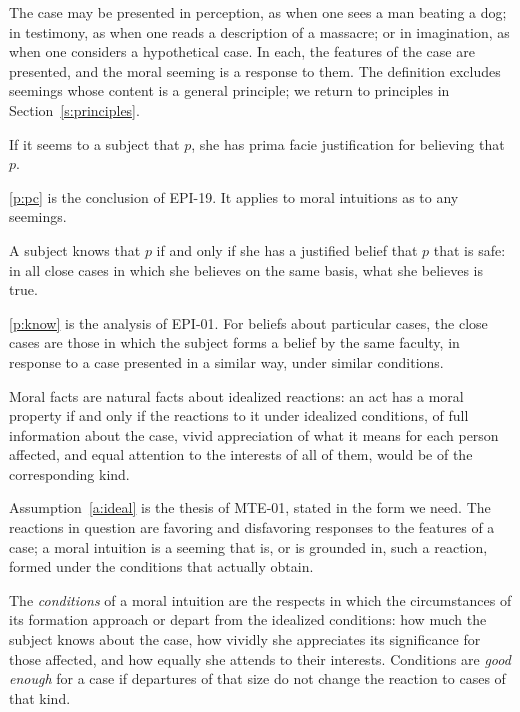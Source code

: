 \documentclass{situationist-preprint}
\begin{document}
The case may be presented in perception, as when one sees a man beating a dog; in testimony, as when one reads a description of a massacre; or in imagination, as when one considers a hypothetical case. In each, the features of the case are presented, and the moral seeming is a response to them. The definition excludes seemings whose content is a general principle; we return to principles in Section~\ref{s:principles}.

\begin{principle}\label{p:pc}
If it seems to a subject that $p$, she has prima facie justification for believing that $p$.
\end{principle}

\ref{p:pc} is the conclusion of EPI-19. It applies to moral intuitions as to any seemings.

\begin{principle}[Knowledge]\label{p:know}
A subject knows that $p$ if and only if she has a justified belief that $p$ that is safe: in all close cases in which she believes on the same basis, what she believes is true.
\end{principle}

\ref{p:know} is the analysis of EPI-01. For beliefs about particular cases, the close cases are those in which the subject forms a belief by the same faculty, in response to a case presented in a similar way, under similar conditions.

\begin{assumption}\label{a:ideal}
Moral facts are natural facts about idealized reactions: an act has a moral property if and only if the reactions to it under idealized conditions, of full information about the case, vivid appreciation of what it means for each person affected, and equal attention to the interests of all of them, would be of the corresponding kind.
\end{assumption}

Assumption~\ref{a:ideal} is the thesis of MTE-01, stated in the form we need. The reactions in question are favoring and disfavoring responses to the features of a case; a moral intuition is a seeming that is, or is grounded in, such a reaction, formed under the conditions that actually obtain.

\begin{definition}[Conditions]\label{d:conditions}
The \emph{conditions} of a moral intuition are the respects in which the circumstances of its formation approach or depart from the idealized conditions: how much the subject knows about the case, how vividly she appreciates its significance for those affected, and how equally she attends to their interests. Conditions are \emph{good enough} for a case if departures of that size do not change the reaction to cases of that kind.
\end{definition}
\end{document}
